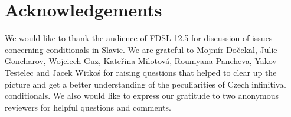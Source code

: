 \documentclass[output=paper,colorlinks,citecolor=brown,
modfonts,newtxmath
]{langscibook}
\begin{document}
\section*{Acknowledgements}

We would like to thank the audience of FDSL 12.5 for discussion of issues concerning conditionals in Slavic. We are grateful to Mojmír Dočekal, Julie Goncharov, Wojciech Guz, Kateřina Milotová, Roumyana Pancheva, Yakov Testelec and Jacek Witkoś for raising questions that helped to clear up the picture and get a better understanding of the peculiarities of Czech infinitival conditionals. We also would like to express our gratitude to two anonymous reviewers for helpful questions and comments.

{\sloppy
\printbibliography[heading=subbibliography,notkeyword=this]
}
\end{document}
